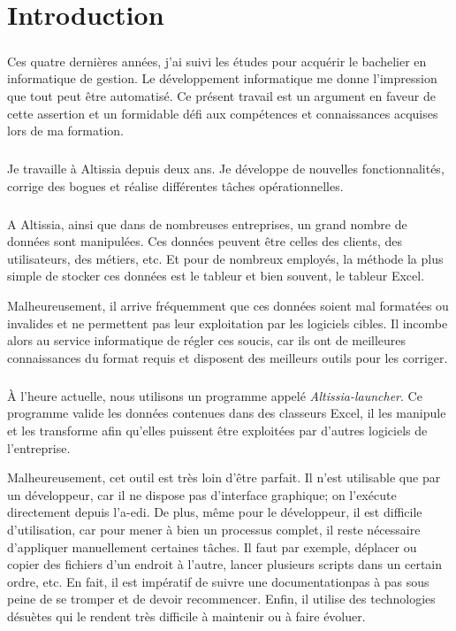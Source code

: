 \chapter{Introduction}
\label{ch:introduction}

\paragraph{}
Ces quatre dernières années, j'ai suivi les études pour acquérir le bachelier en informatique de gestion.
Le développement informatique me donne l'impression que tout peut être automatisé.
Ce présent travail est un argument en faveur de cette assertion et un formidable défi aux compétences et connaissances acquises lors de ma formation.

\paragraph{}
Je travaille à Altissia depuis deux ans.
Je développe de nouvelles fonctionnalités, corrige des bogues et réalise différentes tâches opérationnelles.

\paragraph{}
A Altissia, ainsi que dans de nombreuses entreprises, un grand nombre de données sont manipulées.
Ces données peuvent être celles des clients, des utilisateurs, des métiers, etc.
Et pour de nombreux employés, la méthode la plus simple de stocker ces données est le tableur et bien souvent, le tableur Excel.

Malheureusement, il arrive fréquemment que ces données soient mal formatées ou invalides et ne permettent pas leur exploitation par les logiciels cibles.
Il incombe alors au service informatique de régler ces soucis, car ils ont de meilleures connaissances du format requis et disposent des meilleurs outils pour les corriger.

\paragraph{}
À l'heure actuelle, nous utilisons un programme appelé \textit{Altissia-launcher}.
Ce programme valide les données contenues dans des classeurs Excel, il les manipule et les transforme afin qu'elles puissent être exploitées par d'autres logiciels de l'entreprise.

Malheureusement, cet outil est très loin d'être parfait.
Il n'est utilisable que par un développeur, car il ne dispose pas d'interface graphique; on l'exécute directement depuis l'\gls{a-edi}.
De plus, même pour le développeur, il est difficile d'utilisation, car pour mener à bien un processus complet, il reste nécessaire d'appliquer manuellement certaines tâches.
Il faut par exemple, déplacer ou copier des fichiers d'un endroit à l'autre, lancer plusieurs scripts dans un certain ordre, etc.
En fait, il est impératif de suivre une documentation\fnmark pas à pas sous peine de se tromper et de devoir recommencer.
Enfin, il utilise des technologies désuètes qui le rendent très difficile à maintenir ou à faire évoluer.

